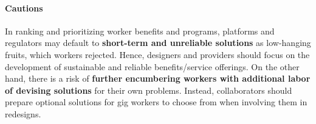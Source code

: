 
\paragraph{Cautions}
In ranking and prioritizing worker benefits and programs, platforms and regulators may default to \textbf{short-term and unreliable solutions} as low-hanging fruits, which workers rejected. Hence, designers and providers should focus on the development of sustainable and reliable benefits/service offerings. 
On the other hand, there is a risk of \textbf{further encumbering workers with additional labor of devising solutions} for their own problems. Instead, collaborators should prepare optional solutions for gig workers to choose from when involving them in redesigns.
